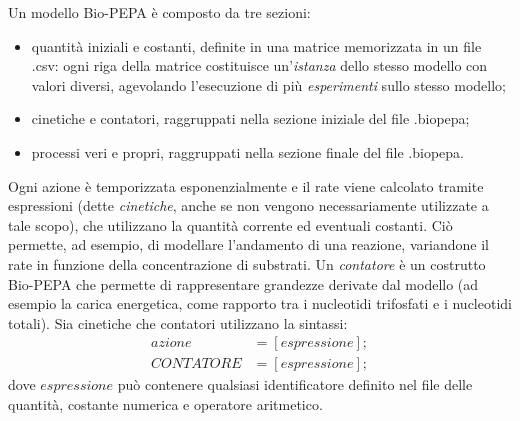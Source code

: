 		Un modello Bio-PEPA \`e composto da tre sezioni:
		\begin{itemize}
			\item quantit\`a iniziali e costanti, definite in una matrice memorizzata in un file .csv: ogni riga della matrice costituisce un'\emph{istanza} dello stesso modello con valori diversi, agevolando l'esecuzione di pi\`u \emph{esperimenti} sullo stesso modello;
			\item cinetiche e contatori, raggruppati nella sezione iniziale del file .biopepa;
			\item processi veri e propri, raggruppati nella sezione finale del file .biopepa.
		\end{itemize}
		
		Ogni azione \`e temporizzata esponenzialmente e il rate viene calcolato tramite espressioni (dette \emph{cinetiche}, anche se non vengono necessariamente utilizzate a tale scopo), che utilizzano la quantit\`a corrente ed eventuali costanti.
		Ci\`o permette, ad esempio, di modellare l'andamento di una reazione, variandone il rate in funzione della concentrazione di substrati.
		Un \emph{contatore} \`e un costrutto Bio-PEPA che permette di rappresentare grandezze derivate dal modello (ad esempio la carica energetica, come rapporto tra i nucleotidi trifosfati e i nucleotidi totali).
		Sia cinetiche che contatori utilizzano la sintassi:
		\begin{align*}
			azione &= [espressione];\\
			CONTATORE &= [espressione];
		\end{align*}
		dove $espressione$ pu\`o contenere qualsiasi identificatore definito nel file delle quantit\`a, costante numerica e operatore aritmetico.
		
